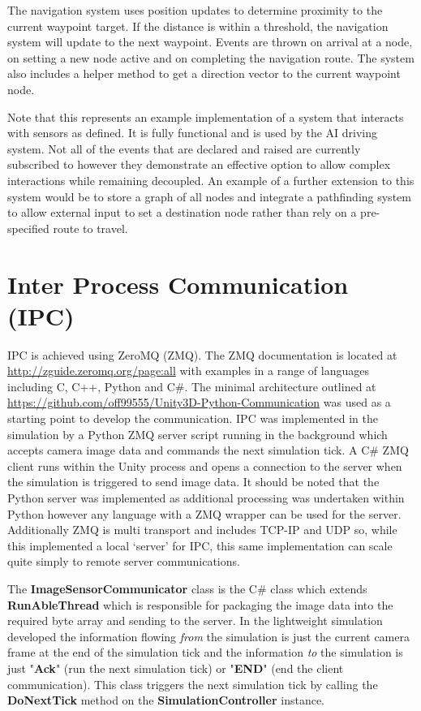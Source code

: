 \documentclass{article}
\begin{document}
The navigation system uses position updates to determine proximity to the current waypoint target. If the distance is within a threshold, the navigation system will update to the next waypoint. Events are thrown on arrival at a node, on setting a new node active and on completing the navigation route. The system also includes a helper method to get a direction vector to the current waypoint node.

Note that this represents an example implementation of a system that interacts with sensors as defined. It is fully functional and is used by the AI driving system. Not all of the events that are declared and raised are currently subscribed to however they demonstrate an effective option to allow complex interactions while remaining decoupled. An example of a further extension to this system would be to store a graph of all nodes and integrate a pathfinding system to allow external input to set a destination node rather than rely on a pre-specified route to travel.

\section{Inter Process Communication (IPC)}\label{s:ipc}

IPC is achieved using ZeroMQ (ZMQ). The ZMQ documentation is located at \url{http://zguide.zeromq.org/page:all} with examples in a range of languages including C, C++, Python and C\#. The minimal architecture outlined at \url{https://github.com/off99555/Unity3D-Python-Communication} was used as a starting point to develop the communication. IPC was implemented in the simulation by a Python ZMQ server script running in the background which accepts camera image data and commands the next simulation tick. A C\# ZMQ client runs within the Unity process and opens a connection to the server when the simulation is triggered to send image data. It should be noted that the Python server was implemented as additional processing was undertaken within Python however any language with a ZMQ wrapper can be used for the server. Additionally ZMQ is multi transport and includes TCP-IP and UDP so, while this implemented a local `server' for IPC, this same implementation can scale quite simply to remote server communications. 

The \textbf{ImageSensorCommunicator} class is the C\# class which extends \textbf{RunAbleThread} which is responsible for packaging the image data into the required byte array and sending to the server. In the lightweight simulation developed the information flowing \textit{from} the simulation is just the current camera frame at the end of the simulation tick and the information \textit{to} the simulation is just "\textbf{Ack}" (run the next simulation tick) or "\textbf{END}" (end the client communication). This class triggers the next simulation tick by calling the \textbf{DoNextTick} method on the \textbf{SimulationController} instance.
\end{document}
